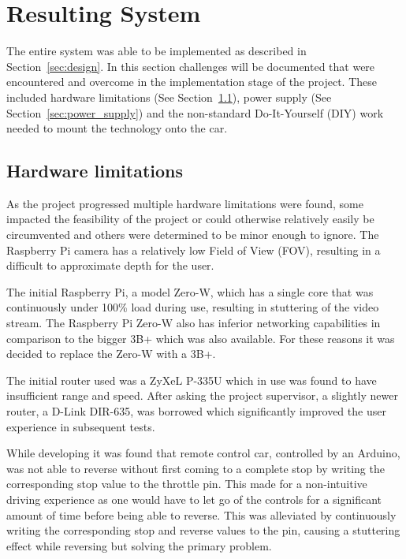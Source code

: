 \section{Resulting System}\label{sec:implementation}

The entire system was able to be implemented as described in
Section~\ref{sec:design}.  In this section challenges will be documented that
were encountered and overcome in the implementation stage of the project. These
included hardware limitations (See Section~\ref{sec:hardware_limitations}),
power supply (See Section~\ref{sec:power_supply}) and the non-standard
Do-It-Yourself (DIY) work needed to mount the technology onto the car.

\subsection{Hardware limitations}\label{sec:hardware_limitations}

As the project progressed multiple hardware limitations were found, some
impacted the feasibility of the project or could otherwise relatively easily
be circumvented and others were determined to be minor enough to ignore.
The Raspberry Pi camera has a relatively low Field of View (FOV), resulting
in a difficult to approximate depth for the user.


The initial Raspberry Pi, a model Zero-W, which has a single core that was
continuously under 100\% load during use, resulting in stuttering of the video
stream. The Raspberry Pi Zero-W also has inferior networking capabilities
in comparison to the bigger 3B+ which was also available.  For these reasons
it was decided to replace the Zero-W with a 3B+.

The initial router used was a ZyXeL P-335U which in use was found to have
insufficient range and speed. After asking the project supervisor, a slightly
newer router, a D-Link DIR-635, was borrowed which significantly improved
the user experience in subsequent tests.

While developing it was found that remote control car, controlled by an
Arduino, was not able to reverse without first coming to a complete stop
by writing the corresponding stop value to the throttle pin. This made
for a non-intuitive driving experience as one would have to let go of the
controls for a significant amount of time before being able to reverse.
This was alleviated by continuously writing the corresponding stop and
reverse values to the pin, causing a stuttering effect while reversing but
solving the primary problem.

